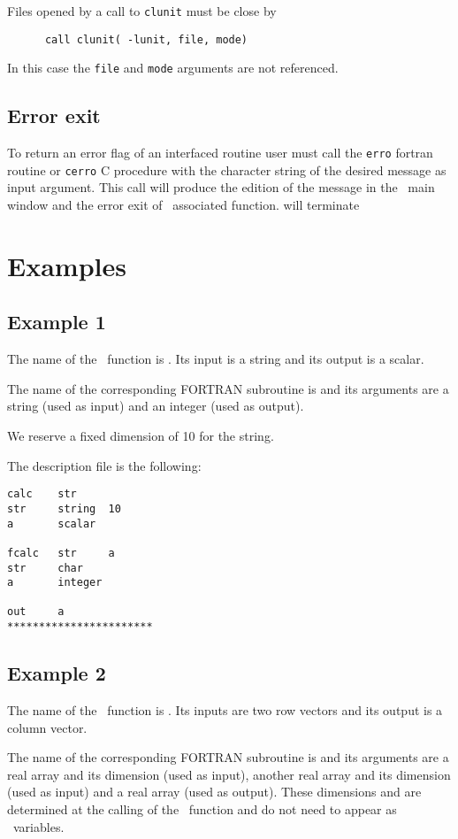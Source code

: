 Files opened by a call to {\tt   clunit} must be close by 
\begin{verbatim}
      call clunit( -lunit, file, mode)
\end{verbatim}
In this case the {\tt file} and  {\tt mode} arguments are not
referenced.

\subsection{Error exit}
To return an error flag of  an interfaced routine user must call the
{\tt erro} fortran routine or {\tt cerro} C procedure with the
character string of the desired message as input argument. This call
will produce the edition of the message in the \SCI\ main window and
the error exit of \SCI\ associated function.
will terminate 
\section{Examples}

\subsection{Example 1}
\label{ex1}

The name of the \SCI\ function is . Its input is a string and its
output is a scalar.

The name of the corresponding FORTRAN subroutine is  and its arguments
are a string (used as input) and an integer (used as output).

We reserve a fixed dimension of 10 for the string.

The description file is the following:
\begin{verbatim}
calc    str
str     string  10
a       scalar

fcalc   str     a
str     char
a       integer

out     a
***********************
\end{verbatim}

\subsection{Example 2}
\label{ex2}

The name of the \SCI\ function is . Its inputs are two row vectors and
its  output is a column vector.

The name of the corresponding FORTRAN subroutine is  and its arguments
are a real array and its dimension (used as input), another 
real array and its dimension (used as input) and a real array (used as output).
These dimensions  and  are determined at the calling of the \SCI\
function and do not need to appear as \SCI\ variables.

